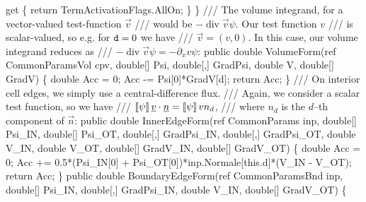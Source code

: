 {\btab    get \{ return TermActivationFlags.AllOn; \}\newline 
\btab \}\newline 
 \newline 
    /// The volume integrand, for a vector-valued test-function $\vec{v}$
    /// would be $-\operatorname{div}{\vec{v}} \psi$. Our test function $v$
    /// is scalar-valued, so e.g. for ${\tt d} = 0$ we have
    /// $\vec{v} = (v,0)$. In this case, our volume integrand reduces as 
    /// $-\operatorname{div}{\vec{v}} \psi = -\partial_x v \psi$:
\btab public double VolumeForm(ref CommonParamsVol cpv, \newline 
\btab \btab    double[] Psi, double[,] GradPsi, \newline 
\btab \btab    double V, double[] GradV) \{\newline 
 \newline 
\btab \btab double Acc = 0;\newline 
\btab \btab Acc -= Psi[0]*GradV[d];\newline 
\btab \btab return Acc;\newline 
\btab \}        \newline 
 \newline 
    /// On interior cell edges, we simply use a central-difference flux.
    /// Again, we consider a scalar test function, so we have
    /// $ \left[\!\left[{\psi}\right]\!\right] \underline{v} \cdot \underline{n} = \left[\!\left[{\psi}\right]\!\right] v n_d $,
    /// where $n_d$ is the $d$--th component of $\vec{n}$:
\btab public double InnerEdgeForm(ref CommonParams inp, \newline 
\btab \btab double[] Psi\_IN, double[] Psi\_OT, \newline 
\btab \btab double[,] GradPsi\_IN, double[,] GradPsi\_OT, \newline 
\btab \btab double V\_IN, double V\_OT, double[] GradV\_IN, double[] GradV\_OT) \{\newline 
 \newline 
\btab \btab double Acc = 0;\newline 
\btab \btab Acc += 0.5*(Psi\_IN[0] + Psi\_OT[0])*inp.Normale[this.d]*(V\_IN - V\_OT);\newline 
\btab \btab return Acc;  \newline 
\btab  \}\newline 
 \newline 
\btab public double BoundaryEdgeForm(ref CommonParamsBnd inp, \newline 
\btab \btab double[] Psi\_IN, double[,] GradPsi\_IN, double V\_IN, double[] GradV\_OT) \{\newline 
}

